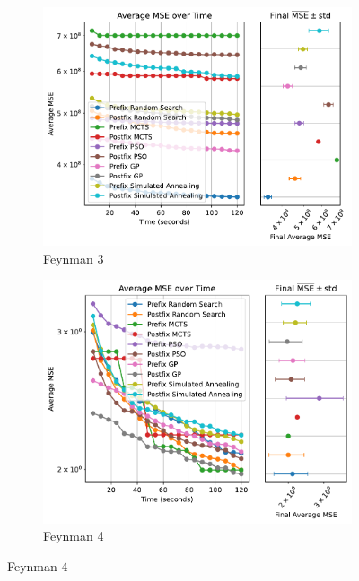 \documentclass[runningheads]{llncs}
\begin{document}
\begin{figure}
    \begin{subfigure}[b]{0.4\textwidth}
        \includegraphics[width=\linewidth, keepaspectratio]{AIFeynman_Benchmarks/Feynman_Benchmark_3.pdf}
        \caption{Feynman 3}
        \label{subfig:feynman_3}
    \end{subfigure}
    \begin{subfigure}[b]{0.4\textwidth}
        \includegraphics[width=\linewidth, keepaspectratio]{AIFeynman_Benchmarks/Feynman_Benchmark_4.pdf}
        \caption{Feynman 4}
        \label{subfig:feynman_4}
    \end{subfigure}
    

\end{figure}
\end{document}
